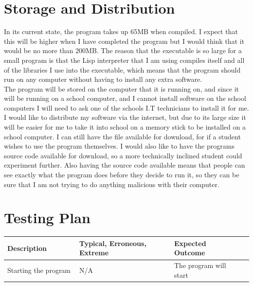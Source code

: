 \section{Storage and Distribution}

In its current state, the program takes up 65MB when compiled. I expect that
this will be higher when I have completed the program but I would think that it
would be no more than 200MB. The reason that the executable is so large for a
small program is that the Lisp interpreter that I am using compiles itself and
all of the libraries I use into the executable, which means that the program
should run on any computer without having to install any extra software. \\

The program will be stored on the computer that it is running on, and since it
will be running on a school computer, and I cannot install software on the
school computers I will need to ask one of the schools I.T technicians to
install it for me. \\

I would like to distribute my software via the internet, but due to its large
size it will be easier for me to take it into school on a memory stick to be
installed on a school computer. I can still have the file available for
download, for if a student wishes to use the program themselves. I would also
like to have the programs source code available for download, so a more
technically inclined student could experiment further. Also having the source
code available means that people can see exactly what the program does before
they decide to run it, so they can be sure that I am not trying to do anything
malicious with their computer. \\

\section{Testing Plan}

\begin{tabular}{p{0.3\linewidth}p{0.4\linewidth}p{0.3\linewidth}} 
	Description & Typical, Erroneous, Extreme & Expected Outcome \\ \hline
	Starting the program & N/A & The program will start && \\ 
	
\end{tabular}
